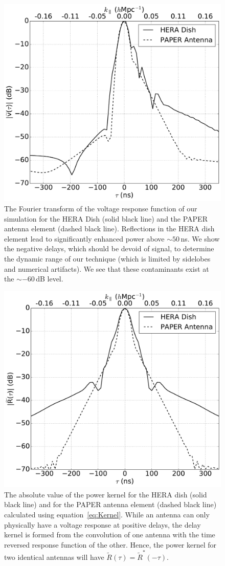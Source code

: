 \documentclass[twocolumn]{emulateapj}
\begin{document}
\begin{figure}[h!]
\includegraphics[width=.5\textwidth]{figures/compare_simulations_paper.pdf}
\caption{The Fourier transform of the voltage response function of our simulation for the HERA Dish (solid black line) and the PAPER antenna element (dashed black line). Reflections in the HERA dish element lead to significantly enhanced power above $\sim 50$\,ns. We show the negative delays, which should be devoid of signal, to determine the dynamic range of our technique (which is limited by sidelobes and numerical artifacts). We see that these contaminants exist at the $\sim-60$\,dB level.}
\label{fig:SimulationResults}
\end{figure}



\begin{figure}[h!]
\includegraphics[width=.5\textwidth]{figures/compare_kernels_paper.pdf}
\caption{The absolute value of the power kernel for the HERA dish (solid black line) and for the PAPER antenna element (dashed black line) calculated using equation~\ref{eq:Kernel}. While an antenna can only physically have a voltage response at positive delays, the delay kernel is formed from the convolution of one antenna with the time reversed response function of the other. Hence, the power kernel for two identical antennas will have $\widetilde{R}(\tau) = \widetilde{R}^*(-\tau)$.}
\label{fig:Kernels}
\end{figure}
\end{document}
